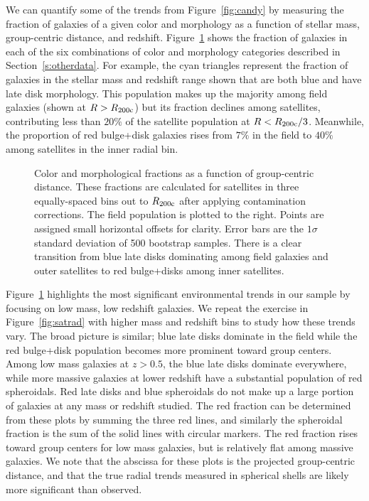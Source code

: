 \documentclass[12pt]{emulateapj}
\begin{document}
We can quantify some of the trends from Figure~\ref{fig:candy} by
measuring the fraction of galaxies of a given color and morphology as
a function of stellar mass, group-centric distance, and
redshift. Figure~\ref{fig:satrad_single} shows the fraction of
galaxies in each of the six combinations of color and morphology
categories described in Section~\ref{s:otherdata}. For example, the
cyan triangles represent the fraction of galaxies in the stellar mass
and redshift range shown that are both blue and have late disk
morphology. This population makes up the majority among field galaxies
(shown at $R > R_{\rm 200c}$) but its fraction declines among
satellites, contributing less than $20\%$ of the satellite population
at $R < R_{\rm 200c}/3$. Meanwhile, the proportion of red bulge+disk
galaxies rises from $7\%$ in the field to $40\%$ among satellites in
the inner radial bin.

\begin{figure}[htb]
\caption{Color and morphological fractions as a function of
  group-centric distance. These fractions are calculated for
  satellites in three equally-spaced bins out to $R_{\rm 200c}$ after
  applying contamination corrections. The field population is plotted
  to the right. Points are assigned small horizontal offsets for
  clarity. Error bars are the $1\sigma$ standard deviation of 500
  bootstrap samples. There is a clear transition from blue late disks
  dominating among field galaxies and outer satellites to red
  bulge+disks among inner satellites.}
\label{fig:satrad_single}
\end{figure}

Figure~\ref{fig:satrad_single} highlights the most significant
environmental trends in our sample by focusing on low mass, low
redshift galaxies. We repeat the exercise in Figure~\ref{fig:satrad}
with higher mass and redshift bins to study how these trends vary. The
broad picture is similar; blue late disks dominate in the field while
the red bulge+disk population becomes more prominent toward group
centers. Among low mass galaxies at $z>0.5$, the blue late disks
dominate everywhere, while more massive galaxies at lower redshift
have a substantial population of red spheroidals. Red late disks and
blue spheroidals do not make up a large portion of galaxies at
any mass or redshift studied. The red fraction can be determined from these plots by
  summing the three red lines, and similarly the spheroidal fraction
  is the sum of the solid lines with circular markers. The red
  fraction rises toward group centers for low mass galaxies, but is
  relatively flat among massive galaxies. We note that the abscissa for these plots is
the projected group-centric distance, and that the true radial trends measured
in spherical shells are likely more significant than observed.
\end{document}

